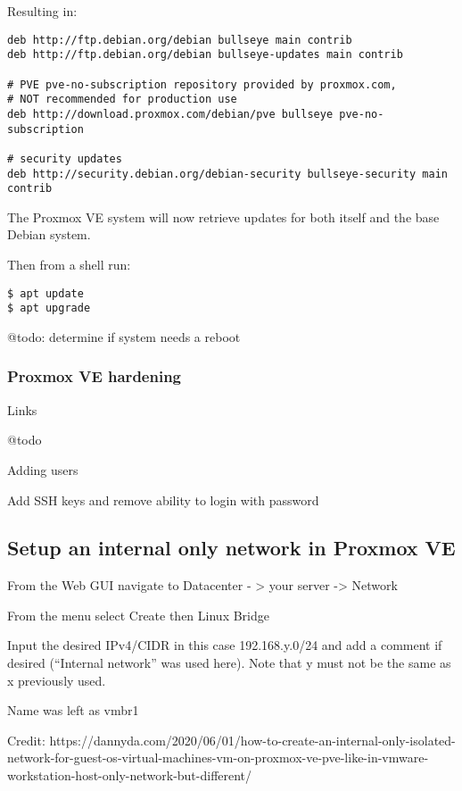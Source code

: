 \documentclass[
	11pt, %
	fleqn, %
	a4paper, %
]{LegrandOrangeBook}
\begin{document}
Resulting in:

\begin{verbatim}
deb http://ftp.debian.org/debian bullseye main contrib
deb http://ftp.debian.org/debian bullseye-updates main contrib

# PVE pve-no-subscription repository provided by proxmox.com,
# NOT recommended for production use
deb http://download.proxmox.com/debian/pve bullseye pve-no-subscription

# security updates
deb http://security.debian.org/debian-security bullseye-security main contrib
\end{verbatim}

The Proxmox VE system will now retrieve updates for both itself and the
base Debian system.

Then from a shell run:

\begin{verbatim}
$ apt update
$ apt upgrade
\end{verbatim}

@todo: determine if system needs a reboot

\hypertarget{proxmox-ve-hardening}{%
\subsubsection{Proxmox VE hardening}\label{proxmox-ve-hardening}}

Links

@todo

Adding users

Add SSH keys and remove ability to login with password

\hypertarget{setup-an-internal-only-network-in-proxmox-ve}{%
\subsection{Setup an internal only network in Proxmox
VE}\label{setup-an-internal-only-network-in-proxmox-ve}}

From the Web GUI navigate to Datacenter - \textgreater{} your server
-\textgreater{} Network

From the menu select Create then Linux Bridge

Input the desired IPv4/CIDR in this case 192.168.y.0/24 and add a
comment if desired (``Internal network'' was used here). Note that y
must not be the same as x previously used.

Name was left as vmbr1

Credit:
https://dannyda.com/2020/06/01/how-to-create-an-internal-only-isolated-network-for-guest-os-virtual-machines-vm-on-proxmox-ve-pve-like-in-vmware-workstation-host-only-network-but-different/
\end{document}
